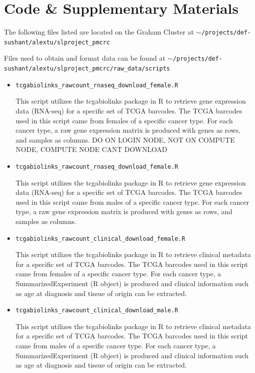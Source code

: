 \documentclass[10pt]{article}
\begin{document}
\clearpage\newpage
\section{Code \& Supplementary Materials}

The following files listed are located on the Graham Cluster at \texttt{$\sim$/projects/def-sushant/alextu/\newline slproject\_pmcrc}

Files used to obtain and format data can be found at \texttt{$\sim$/projects/def-sushant/alextu/\newline slproject\_pmcrc/raw\_data/scripts}
\begin{itemize}
\item\texttt{tcgabiolinks\_rawcount\_rnaseq\_download\_female.R}

This script utilizes the tcgabiolinks package in R to retrieve gene expression data (RNA-seq) for a specific set of TCGA barcodes. The TCGA barcodes used in this script came from females of a specific cancer type. For each cancer type, a raw gene expression matrix is produced with genes as rows, and samples as columns. DO ON LOGIN NODE, NOT ON COMPUTE NODE, COMPUTE NODE CANT DOWNLOAD

\item\texttt{tcgabiolinks\_rawcount\_rnaseq\_download\_female.R}

This script utilizes the tcgabiolinks package in R to retrieve gene expression data (RNA-seq) for a specific set of TCGA barcodes. The TCGA barcodes used in this script came from males of a specific cancer type. For each cancer type, a raw gene expression matrix is produced with genes as rows, and samples as columns.

\item\texttt{tcgabiolinks\_rawcount\_clinical\_download\_female.R}

This script utilizes the tcgabiolinks package in R to retrieve clinical metadata for a specific set of TCGA barcodes. The TCGA barcodes used in this script came from females of a specific cancer type. For each cancer type, a SummarizedExperiment (R object) is produced and clinical information such as age at diagnosis and tissue of origin can be extracted.

\item\texttt{tcgabiolinks\_rawcount\_clinical\_download\_male.R}

This script utilizes the tcgabiolinks package in R to retrieve clinical metadata for a specific set of TCGA barcodes. The TCGA barcodes used in this script came from males of a specific cancer type. For each cancer type, a SummarizedExperiment (R object) is produced and clinical information such as age at diagnosis and tissue of origin can be extracted.


\end{itemize}
\end{document}
